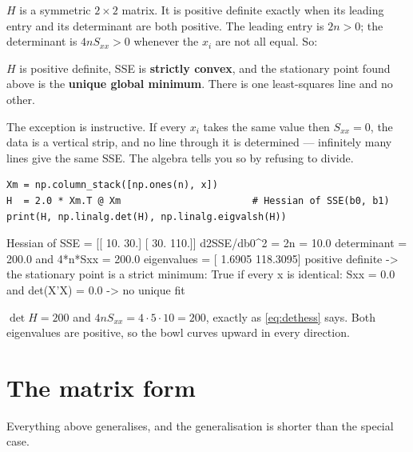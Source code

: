 \documentclass[11pt]{article}
\begin{document}
$H$ is a symmetric $2\times2$ matrix. It is positive definite exactly when its
leading entry and its determinant are both positive. The leading entry is
$2n>0$; the determinant is $4nS_{xx}>0$ whenever the $x_i$ are not all equal.
So:

\begin{keyidea}
$H$ is positive definite, SSE is \textbf{strictly convex}, and the stationary
point found above is the \textbf{unique global minimum}. There is one
least-squares line and no other.
\end{keyidea}

The exception is instructive. If every $x_i$ takes the same value then
$S_{xx}=0$, the data is a vertical strip, and no line through it is
determined --- infinitely many lines give the same SSE. The algebra tells you
so by refusing to divide.

\begin{tryit}
\begin{lstlisting}
Xm = np.column_stack([np.ones(n), x])
H  = 2.0 * Xm.T @ Xm                       # Hessian of SSE(b0, b1)
print(H, np.linalg.det(H), np.linalg.eigvalsh(H))
\end{lstlisting}
\begin{codeout}
Hessian of SSE =
 [[ 10.  30.]
 [ 30. 110.]]
d2SSE/db0^2 = 2n      = 10.0
determinant           = 200.0
and 4*n*Sxx           = 200.0
eigenvalues           = [  1.6905 118.3095]
positive definite -> the stationary point is a strict minimum: True
if every x is identical: Sxx = 0.0 and det(X'X) = 0.0 -> no unique fit
\end{codeout}
$\det H = 200$ and $4nS_{xx} = 4\cdot 5\cdot 10 = 200$, exactly as
\eqref{eq:dethess} says. Both eigenvalues are positive, so the bowl curves
upward in every direction.
\end{tryit}

\section{The matrix form}
\label{sec:matrix}

Everything above generalises, and the generalisation is shorter than the
special case.
\end{document}
